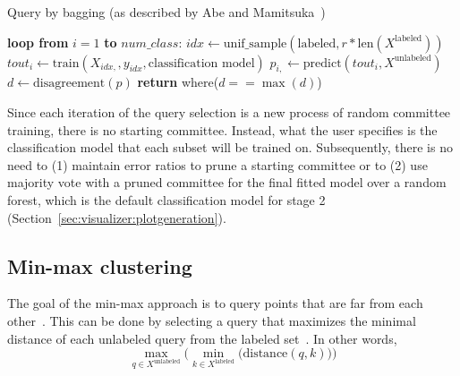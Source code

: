 \tablespacing
\begin{algorithm}[H]
	\caption{Query by bagging (as described by Abe and 
	Mamitsuka~\cite{abe1998})}\label{alg:al:methods:bagging}
	\begin{algorithmic}[1]
		\State \textbf{loop from} $i=1$ \textbf{to} $num\_class$:
		\State \indent $idx \gets \text{unif\_sample}(\text{labeled}, 
		r*\text{len}(X^{\text{labeled}}) )$
		\State \indent $\textit{tout}_{i} \gets 
		\text{train}(X_{idx, },y_{idx},\text{classification model})$
		\State \indent $p_{i,} \gets 
		\text{predict}(\textit{tout}_i,X^{\text{unlabeled}})$
		\State $d \gets \text{disagreement}(p)$
		\State \textbf{return} where($d==\max{(d)}$)
		\EndProcedure
	\end{algorithmic}
\end{algorithm}
\bodyspacing

\noindent Since each iteration of the query selection is a new process of 
random committee training, there is no starting committee. Instead, what the 
user specifies is the classification model that each subset will be trained on. 
Subsequently, there is no need to (1) maintain error ratios to prune a starting 
committee or to (2) use majority vote with a pruned committee for the final 
fitted model over a random forest, which is the default classification model 
for stage 2 (Section~\ref{sec:visualizer:plotgeneration}).










\subsection{Min-max clustering}
\label{sec:al:methods:clustering}

The goal of the min-max approach is to query points that are far from each 
other~\cite{vu2010}. This can be done by selecting a query that maximizes the 
minimal distance of each unlabeled query from the labeled set~\cite{vu2010}. 
In other words, 
$$\max\limits_{q \in X^{\text{unlabeled}}} \bigg( \min\limits_{k \in 
X^{\text{labeled}}} \bigg( \text{distance}(q,k) \bigg) \bigg)$$

